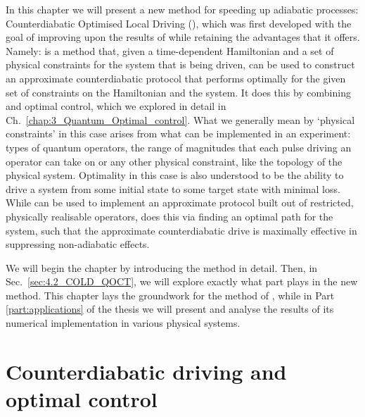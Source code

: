 In this chapter we will present a new method for speeding up adiabatic processes: Counterdiabatic Optimised Local Driving (), which was first developed with the goal of improving upon the results of  while retaining the advantages that it offers. Namely:  is a method that, given a time-dependent Hamiltonian and a set of physical constraints for the system that is being driven, can be used to construct an approximate counterdiabatic protocol that performs optimally for the given set of constraints on the Hamiltonian and the system. It does this by combining  and optimal control, which we explored in detail in Ch.~\ref{chap:3_Quantum_Optimal_control}. What we generally mean by `physical constraints' in this case arises from what can be implemented in an experiment: types of quantum operators, the range of magnitudes that each pulse driving an operator can take on or any other physical constraint, like the topology of the physical system. Optimality in this case is also understood to be the ability to drive a system from some initial state to some target state with minimal loss. While  can be used to implement an approximate  protocol built out of restricted, physically realisable operators,  does this via finding an optimal path for the system, such that the approximate counterdiabatic drive is maximally effective in suppressing non-adiabatic effects.

We will begin the chapter by introducing the  method in detail. Then, in Sec.~\ref{sec:4.2_COLD_QOCT}, we will explore exactly what part  plays in the new method. This chapter lays the groundwork for the method of , while in Part \ref{part:applications} of the thesis we will present and analyse the results of its numerical implementation in various physical systems.

\section{Counterdiabatic driving and optimal control}\label{sec:4.1_COLD}

